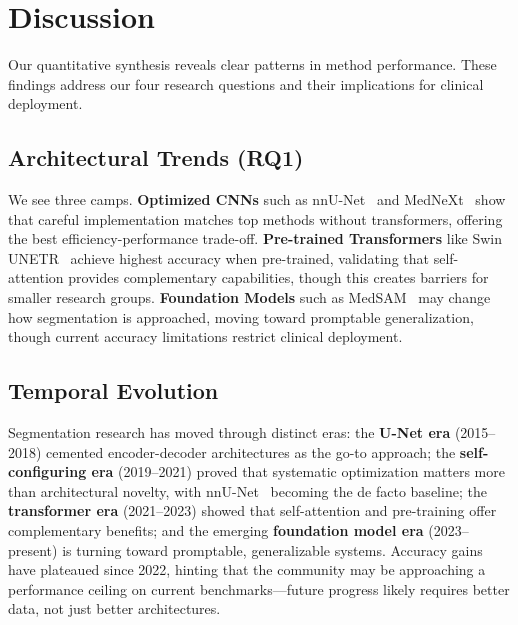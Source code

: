 \FloatBarrier

\section{Discussion}
\label{sec:discussion}

Our quantitative synthesis reveals clear patterns in method performance. These findings address our four research questions and their implications for clinical deployment.

\subsection{Architectural Trends (RQ1)}

We see three camps. \textbf{Optimized CNNs} such as nnU-Net~\cite{isensee2021nnunet} and MedNeXt~\cite{roy2023mednext} show that careful implementation matches top methods without transformers, offering the best efficiency-performance trade-off. \textbf{Pre-trained Transformers} like Swin UNETR~\cite{swinunetr2022} achieve highest accuracy when pre-trained, validating that self-attention provides complementary capabilities, though this creates barriers for smaller research groups. \textbf{Foundation Models} such as MedSAM~\cite{ma2024medsam} may change how segmentation is approached, moving toward promptable generalization, though current accuracy limitations restrict clinical deployment.

\subsection{Temporal Evolution}

Segmentation research has moved through distinct eras: the \textbf{U-Net era} (2015--2018) cemented encoder-decoder architectures as the go-to approach; the \textbf{self-configuring era} (2019--2021) proved that systematic optimization matters more than architectural novelty, with nnU-Net~\cite{isensee2021nnunet} becoming the de facto baseline; the \textbf{transformer era} (2021--2023) showed that self-attention and pre-training offer complementary benefits; and the emerging \textbf{foundation model era} (2023--present) is turning toward promptable, generalizable systems. Accuracy gains have plateaued since 2022, hinting that the community may be approaching a performance ceiling on current benchmarks---future progress likely requires better data, not just better architectures.

